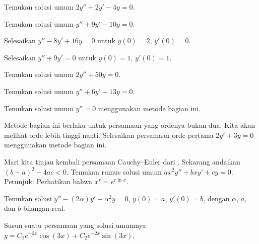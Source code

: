 \begin{exercise}
Temukan solusi umum $2y'' + 2y' -4 y = 0$.
\end{exercise}

\begin{exercise}
Temukan solusi umum $y'' + 9y' - 10 y = 0$.
\end{exercise}

\begin{exercise}
Selesaikan $y'' - 8y' + 16 y = 0$ untuk $y(0) = 2$, $y'(0) = 0$.
\end{exercise}

\begin{exercise}
Selesaikan $y'' + 9y' = 0$ untuk $y(0) = 1$, $y'(0) = 1$.
\end{exercise}

\begin{exercise}
Temukan solusi umum $2y'' + 50y = 0$.
\end{exercise}

\begin{exercise}
Temukan solusi umum $y'' + 6 y' + 13 y = 0$.
\end{exercise}

\begin{exercise}
Temukan solusi umum $y'' = 0$ menggunakan metode bagian ini.
\end{exercise}

\begin{exercise}
Metode bagian ini berlaku untuk persamaan yang ordenya bukan dua. Kita akan melihat orde lebih tinggi nanti. Selesaikan persamaan orde pertama $2y' + 3y = 0$ menggunakan metode bagian ini.
\end{exercise}

\begin{exercise}
Mari kita tinjau kembali persamaan Cauchy--Euler dari . Sekarang andaikan ${(b-a)}^2-4ac < 0$. Temukan rumus solusi umum $a x^2 y'' + b x y' + c y = 0$. Petunjuk: Perhatikan bahwa $x^r = e^{r \ln x}$.
\end{exercise}

\begin{exercise}
Temukan solusi $y''-(2\alpha) y' + \alpha^2 y=0$, $y(0) = a$, $y'(0)=b$, dengan $\alpha$, $a$, dan $b$ bilangan real.
\end{exercise}

\begin{exercise}
Susun suatu persamaan yang solusi umumnya $y = C_1 e^{-2x} \cos(3x) + C_2 e^{-2x} \sin(3x)$.
\end{exercise}

